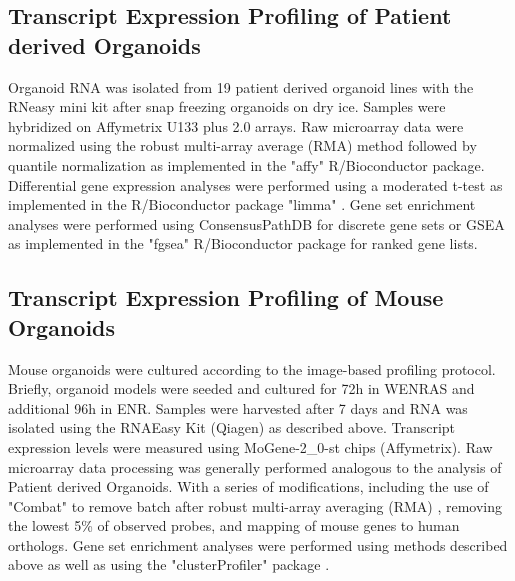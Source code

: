 \begin{flushleft}
\subsection{Transcript Expression Profiling of Patient derived Organoids}
Organoid RNA was isolated from 19 patient derived organoid lines with the RNeasy mini kit after snap freezing organoids on dry ice. Samples were hybridized on Affymetrix U133 plus 2.0 arrays. 
\bigbreak
Raw microarray data were normalized using the robust multi-array average (RMA) method \parencite{irizarryExplorationNormalizationSummaries2003} followed by quantile normalization as implemented in the "affy" \parencite{gautierAffyAnalysisAffymetrix2004} R/Bioconductor \parencite{huberOrchestratingHighthroughputGenomic2015} package. Differential gene expression analyses were performed using a moderated t-test as implemented in the R/Bioconductor package "limma" \parencite{ritchieLimmaPowersDifferential2015}. Gene set enrichment analyses were performed using ConsensusPathDB \parencite{kamburovConsensusPathDBMoreComplete2011} for discrete gene sets or GSEA as implemented in the "fgsea" R/Bioconductor package for ranked gene lists. 

\subsection{Transcript Expression Profiling of Mouse Organoids}
Mouse organoids were cultured according to the image-based profiling protocol. Briefly, organoid models were seeded and cultured for 72h in WENRAS and additional 96h in ENR. Samples were harvested after 7 days and RNA was isolated using the RNAEasy Kit (Qiagen) as described above. Transcript expression levels were measured using MoGene-2\_0-st chips (Affymetrix).
\bigbreak
Raw microarray data processing was generally performed analogous to the analysis of Patient derived Organoids. With a series of modifications, including the use of "Combat" \parencite{leekCapturingHeterogeneityGene2007} to remove batch after robust multi-array averaging (RMA) \parencite{irizarryExplorationNormalizationSummaries2003}, removing the lowest 5\% of observed probes, and mapping of mouse genes to human orthologs. Gene set enrichment analyses were performed using methods described above as well as using the "clusterProfiler" package \parencite{yuClusterProfilerPackageComparing2012}. 


\end{flushleft}
